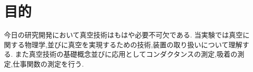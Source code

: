 \documentclass[uplatex,a4j,11pt,dvipdfmx]{jsarticle}
\begin{document}
\section{目的}
今日の研究開発において真空技術はもはや必要不可欠である.
当実験では真空に関する物理学,並びに真空を実現するための技術,装置の取り扱いについて理解する.
また真空技術の基礎概念並びに応用としてコンダクタンスの測定,吸着の測定,仕事関数の測定を行う.
\newpage

\newpage
\newpage


\end{document}
